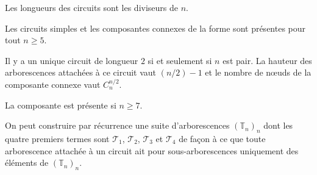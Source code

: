 
\begin{conj}
Les longueurs des circuits sont les diviseurs de $n$.
\end{conj}

\begin{conj}
Les circuits simples et les composantes connexes de la forme  sont pr\'esentes pour tout $n\geqslant 5$.
\end{conj}

\begin{conj}
Il y a un unique circuit de longueur $2$ si et seulement si $n$ est pair. La hauteur des arborescences attach\'ees \`a ce circuit vaut $(n/2) - 1$ et le nombre de n\oe uds de la composante connexe vaut $C^{n/2}_{n}$.
\end{conj}

\begin{conj}
La composante  est pr\'esente si $n\geqslant 7$.
\end{conj}

\begin{conj}
On peut construire par r\'ecurrence une suite d'arborescences $(\mathbb{T}_{n})_n$ dont les quatre premiers termes sont $\mathcal{T}_1$, $\mathcal{T}_2$, $\mathcal{T}_3$ et $\mathcal{T}_4$ de fa\c con \`a ce que toute arborescence attach\'ee \`a un circuit ait pour sous-arborescences uniquement des \'el\'ements de $(\mathbb{T}_{n})_n$.
\end{conj}
